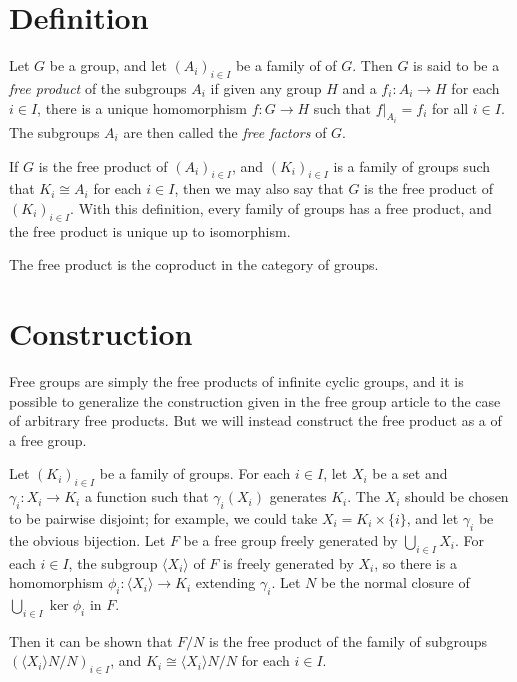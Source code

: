 \documentclass[12pt]{article}
\def\genby#1{{\langle #1\rangle}}
\def\isomorphic{\cong}
\begin{document}

\section*{Definition}

Let $G$ be a group, and let $(A_i)_{i\in I}$ be 
a family of  of $G$.
Then $G$ is said to be a \emph{free product} of the subgroups $A_i$
if given any group $H$ and 
a  
$f_i\colon A_i\to H$ for each $i\in I$,
there is a unique homomorphism $f\colon G\to H$
such that $f|_{A_i}=f_i$ for all $i\in I$.
The subgroups $A_i$ are then called the \emph{free factors} of $G$.

If $G$ is the free product of $(A_i)_{i\in I}$,
and $(K_i)_{i\in I}$ is a family of groups such that $K_i\isomorphic A_i$
for each $i\in I$,
then we may also say that $G$ is the free product of $(K_i)_{i\in I}$.
With this definition, every family of groups has a free product,
and the free product is unique up to isomorphism.

The free product is the coproduct in the category of groups.

\section*{Construction}

Free groups are simply the free products of infinite cyclic groups,
and it is possible to generalize the construction given in the free group
article to the case of arbitrary free products.
But we will instead construct
the free product as a  of a free group.

Let $(K_i)_{i\in I}$ be a family of groups.
For each $i\in I$,
let $X_i$ be a set and $\gamma_i\colon X_i\to K_i$ a function
such that $\gamma_i(X_i)$ generates $K_i$.
The $X_i$ should be chosen to be pairwise disjoint;
for example, we could take $X_i=K_i\times\{i\}$,
and let $\gamma_i$ be the obvious bijection.
Let $F$ be a free group freely generated by $\bigcup_{i\in I}X_i$.
For each $i\in I$,
the subgroup $\genby{X_i}$ of $F$ is freely generated by $X_i$,
so there is a homomorphism $\phi_i\colon\genby{X_i}\to K_i$
extending $\gamma_i$.
Let $N$ be the normal closure of $\bigcup_{i\in I}\ker{\phi_i}$ in $F$.

Then it can be shown that $F/N$ is 
the free product of the family of subgroups $(\genby{X_i}N/N)_{i\in I}$,
and $K_i\isomorphic\genby{X_i}N/N$ for each $i\in I$.
\end{document}
